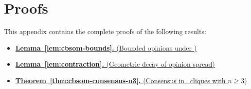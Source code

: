 \section{Proofs}
\label{app:proofs}

This appendix contains the complete proofs of the
following results:

\begin{itemize}

  \item \hyperref[proof:cbsom-bounds]{%
    \textbf{Lemma~\ref{lem:cbsom-bounds}.}
    (Bounded opinions under \CBSOMminus)}

  \item \hyperref[proof:geom-decay]{%
    \textbf{Lemma~\ref{lem:contraction}.}
    (Geometric decay of opinion spread)}

  \item \hyperref[proof:consensus-n3]{%
    \textbf{Theorem~\ref{thm:cbsom-consensus-n3}.}
    (Consensus in \CBSOMminus\ cliques with $n\ge 3$)}

\end{itemize}






